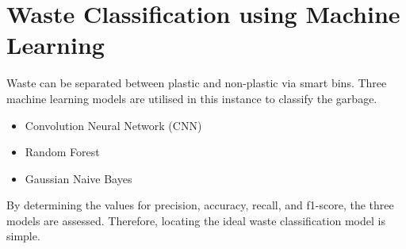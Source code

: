 \section{Waste Classification using Machine Learning}
\par Waste can be separated between plastic and non-plastic via smart bins. Three machine learning models are utilised in this instance to classify the garbage.
\begin{itemize}
    \item Convolution Neural Network (CNN)
    \item Random Forest
    \item Gaussian Naive Bayes
\end{itemize}
\par By determining the values for precision, accuracy, recall, and f1-score, the three models are assessed. Therefore, locating the ideal waste classification model is simple.














































































